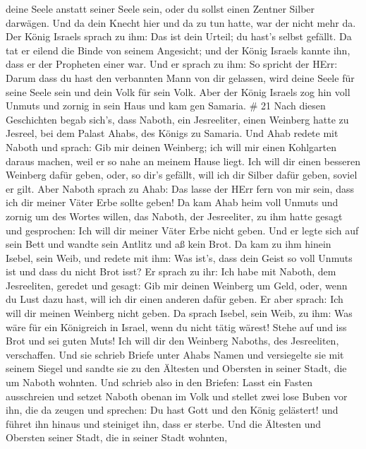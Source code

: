 deine Seele anstatt seiner Seele sein, oder du sollst einen Zentner
Silber darwägen.  Und da dein Knecht hier und da zu tun
hatte, war der nicht mehr da. Der König Israels sprach zu ihm: Das ist
dein Urteil; du hast's selbst gefällt.  Da tat er eilend
die Binde von seinem Angesicht; und der König Israels kannte ihn, dass
er der Propheten einer war.  Und er sprach zu ihm: So
spricht der HErr: Darum dass du hast den verbannten Mann von dir
gelassen, wird deine Seele für seine Seele sein und dein Volk für sein
Volk.  Aber der König Israels zog hin voll Unmuts und
zornig in sein Haus und kam gen Samaria. \# 21  Nach diesen
Geschichten begab sich's, dass Naboth, ein Jesreeliter, einen Weinberg
hatte zu Jesreel, bei dem Palast Ahabs, des Königs zu Samaria.
 Und Ahab redete mit Naboth und sprach: Gib mir deinen
Weinberg; ich will mir einen Kohlgarten daraus machen, weil er so nahe
an meinem Hause liegt. Ich will dir einen besseren Weinberg dafür geben,
oder, so dir's gefällt, will ich dir Silber dafür geben, soviel er gilt.
 Aber Naboth sprach zu Ahab: Das lasse der HErr fern von mir
sein, dass ich dir meiner Väter Erbe sollte geben!  Da kam
Ahab heim voll Unmuts und zornig um des Wortes willen, das Naboth, der
Jesreeliter, zu ihm hatte gesagt und gesprochen: Ich will dir meiner
Väter Erbe nicht geben. Und er legte sich auf sein Bett und wandte sein
Antlitz und aß kein Brot.  Da kam zu ihm hinein Isebel, sein
Weib, und redete mit ihm: Was ist's, dass dein Geist so voll Unmuts ist
und dass du nicht Brot isst?  Er sprach zu ihr: Ich habe mit
Naboth, dem Jesreeliten, geredet und gesagt: Gib mir deinen Weinberg um
Geld, oder, wenn du Lust dazu hast, will ich dir einen anderen dafür
geben. Er aber sprach: Ich will dir meinen Weinberg nicht geben.
 Da sprach Isebel, sein Weib, zu ihm: Was wäre für ein
Königreich in Israel, wenn du nicht tätig wärest! Stehe auf und iss Brot
und sei guten Muts! Ich will dir den Weinberg Naboths, des Jesreeliten,
verschaffen.  Und sie schrieb Briefe unter Ahabs Namen und
versiegelte sie mit seinem Siegel und sandte sie zu den Ältesten und
Obersten in seiner Stadt, die um Naboth wohnten.  Und
schrieb also in den Briefen: Lasst ein Fasten ausschreien und setzet
Naboth obenan im Volk  und stellet zwei lose Buben vor ihn,
die da zeugen und sprechen: Du hast Gott und den König gelästert! und
führet ihn hinaus und steiniget ihn, dass er sterbe.  Und
die Ältesten und Obersten seiner Stadt, die in seiner Stadt wohnten,

